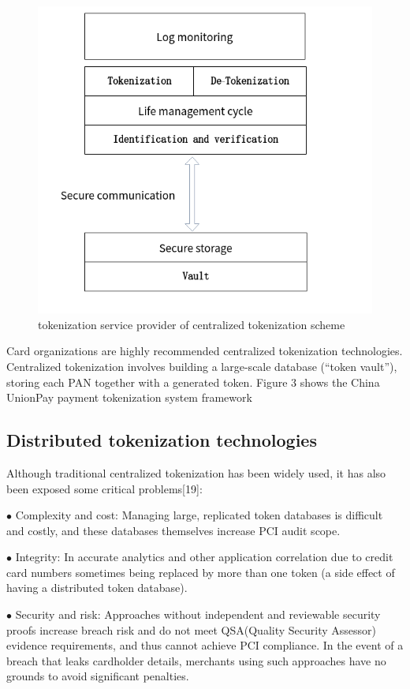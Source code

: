 \documentclass[journal]{IEEEtran}
\begin{document}
\begin{figure}[htbp]
\centerline{\includegraphics[scale=0.4]{tsp.png}}
\caption{tokenization service provider of centralized tokenization scheme}
\label{fig}
\end{figure}
 
Card organizations are highly recommended centralized tokenization technologies. 
Centralized tokenization involves building a large-scale database (“token vault”), storing each PAN together with a generated token. Figure 3 shows the China UnionPay payment tokenization system framework


\subsection{Distributed tokenization technologies}
Although traditional centralized tokenization has been widely used, it has also been exposed some critical problems[19]:

$ \bullet $ Complexity and cost: Managing large, replicated token databases is difficult and costly, and these databases themselves increase PCI audit scope. 

$ \bullet $ Integrity: In accurate analytics and other application correlation due to credit card numbers sometimes being replaced by more than one token (a side effect of having a distributed token database).

$ \bullet $ Security and risk: Approaches without independent and reviewable security proofs increase breach risk and do not meet QSA(Quality 
Security Assessor) evidence requirements, and thus cannot achieve PCI compliance. In the event of a breach that leaks cardholder details, merchants using such approaches have no grounds to avoid significant penalties.
\end{document}
